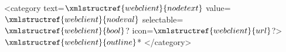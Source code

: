 <category text=$\xmlstructref{webclient}{nodetext}$ value=$\xmlstructref{webclient}{nodeval}$ selectable=$\xmlstructref{webclient}{bool}$? icon=$\xmlstructref{webclient}{url}$?>
    $\xmlstructref{webclient}{outline}$*
</category>
